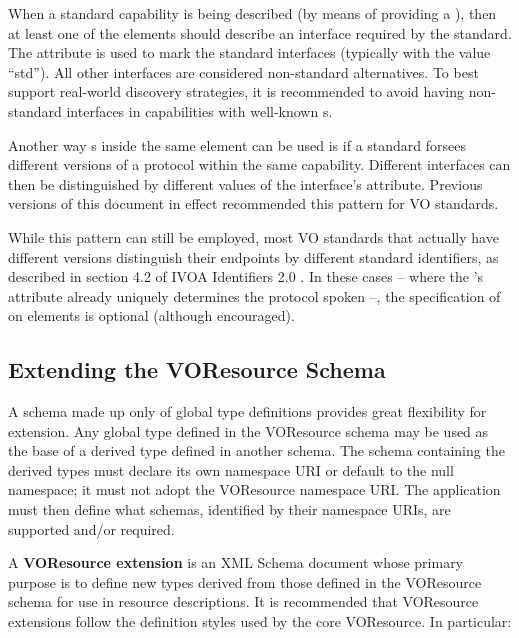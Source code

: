 \documentclass[11pt,a4paper]{ivoa}
\begin{document}
When a standard capability is being described (by means of providing a
), then at least one of the
 elements should describe an interface required
by the standard.  The  attribute is used to mark the
standard interfaces (typically with the value ``std'').
All other interfaces are considered non-standard
alternatives.  To best support real-world discovery strategies, it is
recommended to avoid having non-standard interfaces in capabilities
with well-known s.

Another way s inside the same
 element can be used is if a standard forsees
different versions of a protocol within the same capability.  Different
interfaces can then be distinguished by different values of the
interface's  attribute.  Previous versions of this
document in effect recommended this pattern for VO standards.

While this pattern can still be employed, most VO standards that
actually have different versions distinguish their endpoints by
different standard identifiers, as described in section 4.2 of IVOA
Identifiers 2.0 \citep{2016ivoa.spec.0523D}.  In these cases -- where the
's  attribute already uniquely
determines the protocol spoken --, the specification of 
on  elements is optional (although encouraged).

\subsection{Extending the VOResource Schema}

\label{sect:extending}

A schema made up only of global type definitions provides great
flexibility for extension.  Any global type defined in the VOResource
schema may be used as the base of a derived type defined in another
schema.  The schema containing the derived types must declare its own
namespace URI or default to the null namespace; it must not adopt the
VOResource namespace URI.  The application must then define what
schemas, identified by their namespace URIs, are supported and/or
required.  



A \textbf{VOResource extension} is an XML Schema document whose primary
purpose is to define new types derived from those defined in the
VOResource schema for use in resource descriptions.  It is recommended
that VOResource extensions follow the definition styles used by the core
VOResource.  In particular: 
\end{document}
